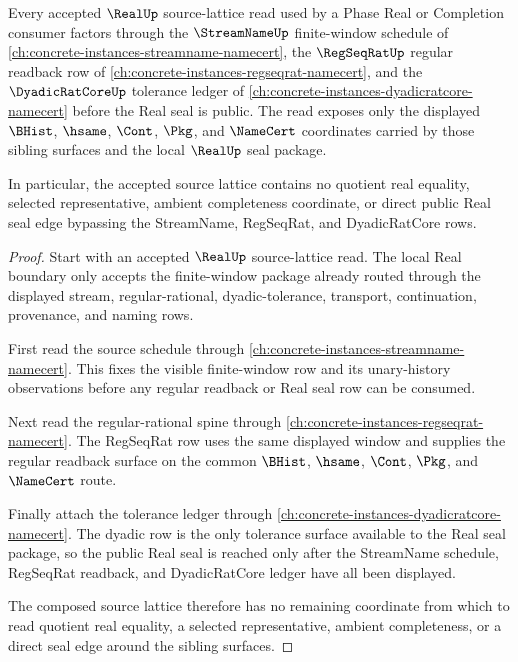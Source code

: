\begin{theorem}
\label{thm:real-streamname-regseqrat-source-lattice}
Every accepted $\RealUp$ source-lattice read used by a Phase Real or
Completion consumer factors through the $\StreamNameUp$ finite-window
schedule of \autoref{ch:concrete-instances-streamname-namecert}, the
$\RegSeqRatUp$ regular readback row of
\autoref{ch:concrete-instances-regseqrat-namecert}, and the
$\DyadicRatCoreUp$ tolerance ledger of
\autoref{ch:concrete-instances-dyadicratcore-namecert} before the Real seal
is public. The read exposes only the displayed $\BHist$, $\hsame$, $\Cont$,
$\Pkg$, and $\NameCert$ coordinates carried by those sibling surfaces and the
local $\RealUp$ seal package.

In particular, the accepted source lattice contains no quotient real equality,
selected representative, ambient completeness coordinate, or direct public
Real seal edge bypassing the StreamName, RegSeqRat, and DyadicRatCore rows.
\end{theorem}
\begin{proof}
Start with an accepted $\RealUp$ source-lattice read. The local Real boundary
only accepts the finite-window package already routed through the displayed
stream, regular-rational, dyadic-tolerance, transport, continuation,
provenance, and naming rows.

First read the source schedule through
\autoref{ch:concrete-instances-streamname-namecert}. This fixes the visible
finite-window row and its unary-history observations before any regular
readback or Real seal row can be consumed.

Next read the regular-rational spine through
\autoref{ch:concrete-instances-regseqrat-namecert}. The RegSeqRat row uses the
same displayed window and supplies the regular readback surface on the common
$\BHist$, $\hsame$, $\Cont$, $\Pkg$, and $\NameCert$ route.

Finally attach the tolerance ledger through
\autoref{ch:concrete-instances-dyadicratcore-namecert}. The dyadic row is the
only tolerance surface available to the Real seal package, so the public Real
seal is reached only after the StreamName schedule, RegSeqRat readback, and
DyadicRatCore ledger have all been displayed.

The composed source lattice therefore has no remaining coordinate from which
to read quotient real equality, a selected representative, ambient
completeness, or a direct seal edge around the sibling surfaces.
\end{proof}


